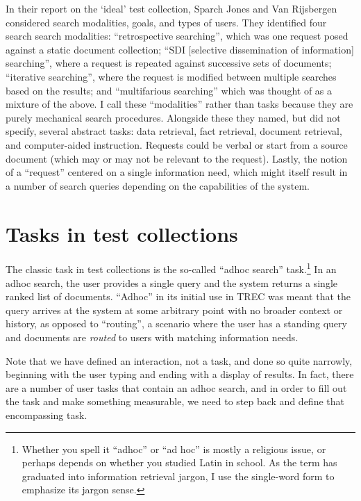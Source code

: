 \documentclass[nobib]{tufte-book}
\begin{document}
In their report on the `ideal' test collection, Sparch Jones and Van Rijsbergen considered search modalities, goals, and types of users.  They identified four search search modalities: ``retrospective searching'', which was one request posed against a static document collection; ``SDI [selective dissemination of information] searching'', where a request is repeated against successive sets of documents; ``iterative searching'', where the request is modified between multiple searches based on the results; and ``multifarious searching'' which was thought of as a mixture of the above.\autocite{sparck_jones_report_1975}  I call these ``modalities'' rather than tasks because they are purely mechanical search procedures.  Alongside these they named, but did not specify, several abstract tasks: data retrieval, fact retrieval, document retrieval, and computer-aided instruction.  Requests could be verbal or start from a source document (which may or may not be relevant to the request).  Lastly, the notion of a ``request'' centered on a single information need, which might itself result in a number of search queries depending on the capabilities of the system.

\section{Tasks in test collections}

The classic task in test collections is the so-called ``adhoc search'' task.\footnote{Whether you spell it ``adhoc'' or ``ad hoc'' is mostly a religious issue, or perhaps depends on whether you studied Latin in school.  As the term has graduated into information retrieval jargon, I use the single-word form to emphasize its jargon sense.}  In an adhoc search, the user provides a single query and the system returns a single ranked list of documents.  ``Adhoc'' in its initial use in TREC was meant that the query arrives at the system at some arbitrary point with no broader context or history, as opposed to ``routing'', a scenario where the user has a standing query and documents are {\em routed} to users with matching information needs.

Note that we have defined an interaction, not a task, and done so quite narrowly, beginning with the user typing and ending with a display of results.  In fact, there are a number of user tasks that contain an adhoc search, and in order to fill out the task and make something measurable, we need to step back and define that encompassing task.
\end{document}
